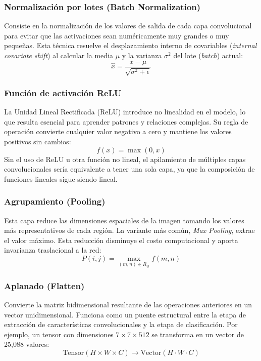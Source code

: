 \subsubsection{Normalización por lotes (Batch Normalization)}
Consiste en la normalización de los valores de salida de cada capa convolucional para evitar que las activaciones sean numéricamente muy grandes o muy pequeñas. Esta técnica resuelve el desplazamiento interno de covariables (\textit{internal covariate shift}) \cite{ioffe2015batch} al calcular la media $\mu$ y la varianza $\sigma^2$ del lote (\textit{batch}) actual:
\begin{equation}
\hat{x} = \frac{x - \mu}{\sqrt{\sigma^2 + \epsilon}}
\end{equation}

\subsubsection{Función de activación ReLU}
La Unidad Lineal Rectificada (ReLU) introduce no linealidad en el modelo, lo que resulta esencial para aprender patrones y relaciones complejas. Su regla de operación convierte cualquier valor negativo a cero y mantiene los valores positivos sin cambios:
\begin{equation}
f(x) = \max(0, x)
\end{equation}
Sin el uso de ReLU u otra función no lineal, el apilamiento de múltiples capas convolucionales sería equivalente a tener una sola capa, ya que la composición de funciones lineales sigue siendo lineal.

\subsubsection{Agrupamiento (Pooling)}
Esta capa reduce las dimensiones espaciales de la imagen tomando los valores más representativos de cada región. La variante más común, \textit{Max Pooling}, extrae el valor máximo. Esta reducción disminuye el costo computacional y aporta invarianza traslacional a la red:
\begin{equation}
P(i,j) = \max_{(m,n) \in R_{ij}} f(m,n)
\end{equation}

\subsubsection{Aplanado (Flatten)}
Convierte la matriz bidimensional resultante de las operaciones anteriores en un vector unidimensional. Funciona como un puente estructural entre la etapa de extracción de características convolucionales y la etapa de clasificación. Por ejemplo, un tensor con dimensiones $7 \times 7 \times 512$ se transforma en un vector de 25,088 valores:
\begin{equation}
\text{Tensor}(H \times W \times C) \rightarrow \text{Vector}(H \cdot W \cdot C)
\end{equation}

